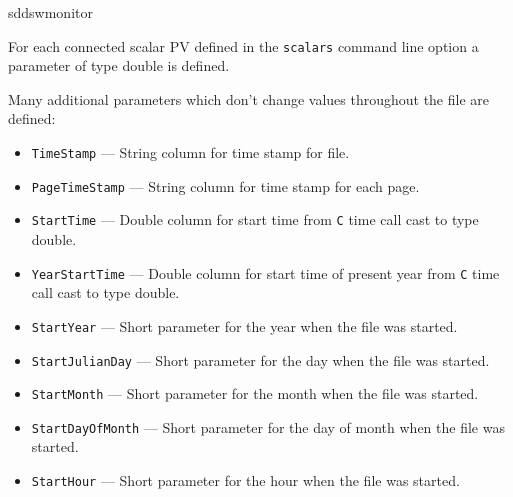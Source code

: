 \begin{sddsprog}{sddswmonitor}
\begin{itemize}
For each connected scalar PV defined in the \verb+scalars+ command line option a parameter of type double is defined.

Many additional parameters which don't change values throughout the file are defined:
  \begin{itemize}
    \item {\tt TimeStamp} --- String column for time stamp for file.
    \item {\tt PageTimeStamp} --- String column for time stamp for each page.
    \item {\tt StartTime} --- Double column for start time from {\tt C} time call cast to type double.
    \item {\tt YearStartTime} --- Double column for start time of present year from {\tt C}
                time call cast to type double.
    \item {\verb+StartYear+} --- Short parameter for the year when the file was started.
    \item {\verb+StartJulianDay+} --- Short parameter for the day when the file was started.
    \item {\verb+StartMonth+} --- Short parameter for the month when the file was started.
    \item {\verb+StartDayOfMonth+} --- Short parameter for the day of month when the file was started.
    \item {\verb+StartHour+} --- Short parameter for the hour when the file was started.
  \end{itemize}
\end{itemize}


\end{sddsprog}
